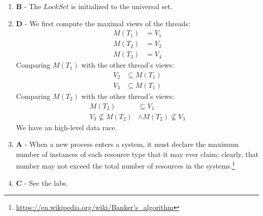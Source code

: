 \documentclass[a4paper,twocolumn]{article}
\begin{document}
\begin{enumerate}
    \item \textbf{B} - The $LockSet$ is initialized to the universal set.
    \item \textbf{D} - We first compute the maximal views of the threads:
    \begin{equation*}
        \begin{split}
            M(T_1) & = V_1 \\
            M(T_2) & = V_2 \\
            M(T_3) & = V_4
        \end{split}
    \end{equation*}
    Comparing $M(T_1)$ with the other thread's views:
    \begin{equation*}
        \begin{split}
            V_2 & \subseteq M(T_1) \\
            V_3 & \subseteq M(T_1)
        \end{split}
    \end{equation*}
    Comparing $M(T_2)$ with the other thread's views:
    \begin{equation*}
        \begin{split}
            M(T_2) & \subseteq V_1 \\
            V_3 \nsubseteq M(T_2) & \wedge M(T_2) \nsubseteq V_3
        \end{split}
    \end{equation*}
    We have an high-level data race.
    \item \textbf{A} - When a new process enters a system, it must declare the maximum number of instances of each resource type that it may ever claim;
    clearly, that number may not exceed the total number of resources in the systems.\footnote{\url{https://en.wikipedia.org/wiki/Banker's_algorithm}}
    \item \textbf{C} - See the labs.
\end{enumerate}
\end{document}

